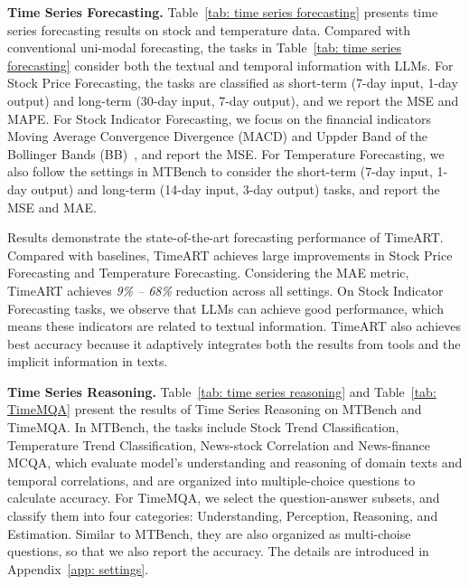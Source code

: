 \textbf{Time Series Forecasting.} Table~\ref{tab: time series forecasting} presents time series forecasting results on stock and temperature data. Compared with conventional uni-modal forecasting, the tasks in Table~\ref{tab: time series forecasting} consider both the textual and temporal information with LLMs. For Stock Price Forecasting, the tasks are classified as short-term (7-day input, 1-day output) and long-term (30-day input, 7-day output), and we report the MSE and MAPE. For Stock Indicator Forecasting, we focus on the financial indicators Moving Average Convergence Divergence (MACD) and Uppder Band of the Bollinger Bands (BB)~\citep{chen2025mtbench}, and report the MSE. For Temperature Forecasting, we also follow the settings in MTBench to consider the short-term (7-day input, 1-day output) and long-term (14-day input, 3-day output) tasks, and report the MSE and MAE. 

Results demonstrate the state-of-the-art forecasting performance of TimeART. Compared with baselines, TimeART achieves large improvements in Stock Price Forecasting and Temperature Forecasting. Considering the MAE metric, TimeART achieves \textit{9\% -- 68\%} reduction across all settings. On Stock Indicator Forecasting tasks, we observe that LLMs can achieve good performance, which means these indicators are related to textual information. TimeART also achieves best accuracy because it adaptively integrates both the results from tools and the implicit information in texts.

\textbf{Time Series Reasoning.}
Table~\ref{tab: time series reasoning} and Table~\ref{tab: TimeMQA} present the results of Time Series Reasoning on MTBench and TimeMQA. In MTBench, the tasks include Stock Trend Classification, Temperature Trend Classification, News-stock Correlation and News-finance MCQA, which evaluate model's understanding and reasoning of domain texts and temporal correlations, and are organized into multiple-choice questions to calculate accuracy. For TimeMQA, we select the question-answer subsets, and classify them into four categories: Understanding, Perception, Reasoning, and Estimation. Similar to MTBench, they are also organized as multi-choise questions, so that we also report the accuracy. The details are introduced in Appendix~\ref{app: settings}.

